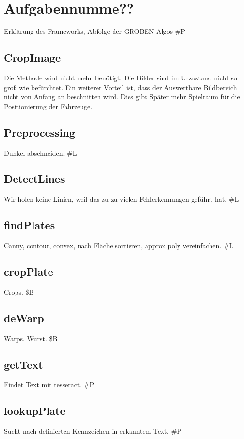 \documentclass{../Vorlage/sebDenCls}
\begin{document}


\section{Aufgabennumme??}
Erklärung des Frameworks, Abfolge der GROBEN Algos
\#P
\subsection{CropImage}
Die Methode wird nicht mehr Benötigt. Die Bilder sind im Urzustand nicht so groß wie befürchtet. Ein weiterer Vorteil ist, dass der Auswertbare Bildbereich nicht von Anfang an beschnitten wird. Dies gibt Später mehr Spielraum für die Positionierung der Fahrzeuge.
\subsection{Preprocessing}
Dunkel abschneiden.
\#L

\subsection{DetectLines}
Wir holen keine Linien, weil das zu zu vielen Fehlerkennungen geführt hat.
\#L
\subsection{findPlates}
Canny, contour, convex, nach Fläche sortieren, approx poly vereinfachen.
\#L
\subsection{cropPlate}
Crops.
\$B
\subsection{deWarp}
Warps. Wurst.
\$B
\subsection{getText}
Findet Text mit tesseract.
\#P
\subsection{lookupPlate}
Sucht nach definierten Kennzeichen in erkanntem Text.
\#P
\end{document}

